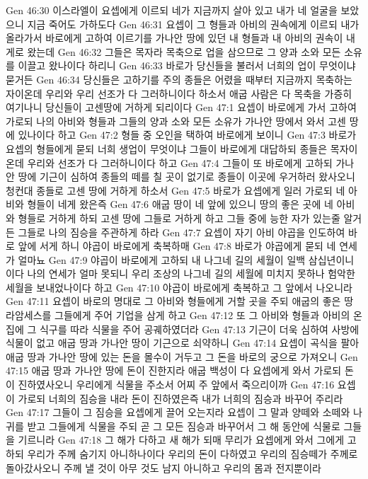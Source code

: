 Gen 46:30  이스라엘이 요셉에게 이르되 네가 지금까지 살아 있고 내가 네 얼굴을 보았으니 지금 죽어도 가하도다
Gen 46:31  요셉이 그 형들과 아비의 권속에게 이르되 내가 올라가서 바로에게 고하여 이르기를 가나안 땅에 있던 내 형들과 내 아비의 권속이 내게로 왔는데
Gen 46:32  그들은 목자라 목축으로 업을 삼으므로 그 양과 소와 모든 소유를 이끌고 왔나이다 하리니
Gen 46:33  바로가 당신들을 불러서 너희의 업이 무엇이냐 묻거든
Gen 46:34  당신들은 고하기를 주의 종들은 어렸을 때부터 지금까지 목축하는 자이온데 우리와 우리 선조가 다 그러하니이다 하소서 애굽 사람은 다 목축을 가증히 여기나니 당신들이 고센땅에 거하게 되리이다
Gen 47:1  요셉이 바로에게 가서 고하여 가로되 나의 아비와 형들과 그들의 양과 소와 모든 소유가 가나안 땅에서 와서 고센 땅에 있나이다 하고
Gen 47:2  형들 중 오인을 택하여 바로에게 보이니
Gen 47:3  바로가 요셉의 형들에게 묻되 너희 생업이 무엇이냐 그들이 바로에게 대답하되 종들은 목자이온데 우리와 선조가 다 그러하니이다 하고
Gen 47:4  그들이 또 바로에게 고하되 가나안 땅에 기근이 심하여 종들의 떼를 칠 곳이 없기로 종들이 이곳에 우거하러 왔사오니 청컨대 종들로 고센 땅에 거하게 하소서
Gen 47:5  바로가 요셉에게 일러 가로되 네 아비와 형들이 네게 왔은즉
Gen 47:6  애굽 땅이 네 앞에 있으니 땅의 좋은 곳에 네 아비와 형들로 거하게 하되 고센 땅에 그들로 거하게 하고 그들 중에 능한 자가 있는줄 알거든 그들로 나의 짐승을 주관하게 하라
Gen 47:7  요셉이 자기 아비 야곱을 인도하여 바로 앞에 서게 하니 야곱이 바로에게 축복하매
Gen 47:8  바로가 야곱에게 묻되 네 연세가 얼마뇨
Gen 47:9  야곱이 바로에게 고하되 내 나그네 길의 세월이 일백 삼십년이니이다 나의 연세가 얼마 못되니 우리 조상의 나그네 길의 세월에 미치지 못하나 험악한 세월을 보내었나이다 하고
Gen 47:10  야곱이 바로에게 축복하고 그 앞에서 나오니라
Gen 47:11  요셉이 바로의 명대로 그 아비와 형들에게 거할 곳을 주되 애굽의 좋은 땅 라암세스를 그들에게 주어 기업을 삼게 하고
Gen 47:12  또 그 아비와 형들과 아비의 온 집에 그 식구를 따라 식물을 주어 공궤하였더라
Gen 47:13  기근이 더욱 심하여 사방에 식물이 없고 애굽 땅과 가나안 땅이 기근으로 쇠약하니
Gen 47:14  요셉이 곡식을 팔아 애굽 땅과 가나안 땅에 있는 돈을 몰수이 거두고 그 돈을 바로의 궁으로 가져오니
Gen 47:15  애굽 땅과 가나안 땅에 돈이 진한지라 애굽 백성이 다 요셉에게 와서 가로되 돈이 진하였사오니 우리에게 식물을 주소서 어찌 주 앞에서 죽으리이까
Gen 47:16  요셉이 가로되 너희의 짐승을 내라 돈이 진하였은즉 내가 너희의 짐승과 바꾸어 주리라
Gen 47:17  그들이 그 짐승을 요셉에게 끌어 오는지라 요셉이 그 말과 양떼와 소떼와 나귀를 받고 그들에게 식물을 주되 곧 그 모든 짐승과 바꾸어서 그 해 동안에 식물로 그들을 기르니라
Gen 47:18  그 해가 다하고 새 해가 되매 무리가 요셉에게 와서 그에게 고하되 우리가 주께 숨기지 아니하나이다 우리의 돈이 다하였고 우리의 짐승떼가 주께로 돌아갔사오니 주께 낼 것이 아무 것도 남지 아니하고 우리의 몸과 전지뿐이라
